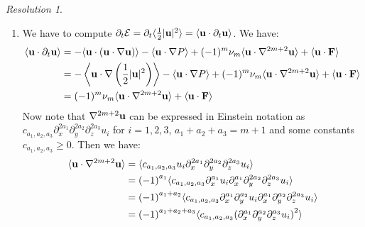 \documentclass[10pt,a4paper]{article}
\theoremstyle{definition}
\theoremstyle{remark}
\newtheorem*{res}{Resolution}
\begin{document}
\begin{res}\hfill
  \begin{enumerate}
    \item We have to compute $\partial_t \mathcal{E}= \partial_t \langle \frac{1}{2} |\boldsymbol{\mathrm{u}}|^2 \rangle= \langle \boldsymbol{\mathrm{u}} \cdot \partial_t \boldsymbol{\mathrm{u}} \rangle$. We have:
          \begin{align*}
            \langle \boldsymbol{\mathrm{u}} \cdot \partial_t \boldsymbol{\mathrm{u}} \rangle & = - \langle \boldsymbol{\mathrm{u}} \cdot (\boldsymbol{\mathrm{u}} \cdot \nabla \boldsymbol{\mathrm{u}})\rangle - \langle \boldsymbol{\mathrm{u}} \cdot \nabla P \rangle + (-1)^m \nu_m \langle \boldsymbol{\mathrm{u}} \cdot \nabla^{2m+2} \boldsymbol{\mathrm{u}} \rangle + \langle \boldsymbol{\mathrm{u}} \cdot \boldsymbol{\mathrm{F}} \rangle                            \\
                                                           & = -  \left\langle \boldsymbol{\mathrm{u}} \cdot \nabla \left(\frac{1}{2}|\boldsymbol{\mathrm{u}}|^2\right) \right\rangle - \langle \boldsymbol{\mathrm{u}} \cdot \nabla P \rangle  + (-1)^m \nu_m \langle \boldsymbol{\mathrm{u}} \cdot \nabla^{2m+2} \boldsymbol{\mathrm{u}} \rangle + \langle \boldsymbol{\mathrm{u}} \cdot \boldsymbol{\mathrm{F}} \rangle \\
                                                           & = (-1)^m \nu_m \langle \boldsymbol{\mathrm{u}} \cdot \nabla^{2m+2} \boldsymbol{\mathrm{u}} \rangle + \langle \boldsymbol{\mathrm{u}} \cdot \boldsymbol{\mathrm{F}} \rangle
          \end{align*}
          Now note that $\nabla^{2m+2} \boldsymbol{\mathrm{u}}$ can be expressed in Einstein notation as $c_{a_1,a_2,a_3}\partial_x^{2a_1} \partial_y^{2a_2} \partial_z^{2a_3} u_i$ for $i=1,2,3$, $a_1+a_2+a_3 = m+1$ and some constants $c_{a_1,a_2,a_3}\geq 0$.
          Then we have:
          \begin{align*}
            \langle \boldsymbol{\mathrm{u}} \cdot \nabla^{2m+2} \boldsymbol{\mathrm{u}} \rangle & = \langle c_{a_1,a_2,a_3}u_i \partial_x^{2a_1} \partial_y^{2a_2} \partial_z^{2a_3} u_i \rangle                                                \\
                                                              & = {(-1)}^{a_1} \langle c_{a_1,a_2,a_3}\partial_x^{a_1} u_i\partial_x^{a_1} \partial_y^{2a_2} \partial_z^{2a_3} u_i \rangle                    \\
                                                              & ={(-1)}^{a_1+a_2} \langle c_{a_1,a_2,a_3}\partial_x^{a_1} \partial_y^{a_2} u_i\partial_x^{a_1} \partial_y^{a_2} \partial_z^{2a_3} u_i \rangle \\
                                                              & ={(-1)}^{a_1+a_2+a_3} \langle c_{a_1,a_2,a_3}{(\partial_x^{a_1} \partial_y^{a_2}\partial_z^{a_3} u_i)}^2 \rangle
          \end{align*}

\end{enumerate}
\end{res}
\end{document}
